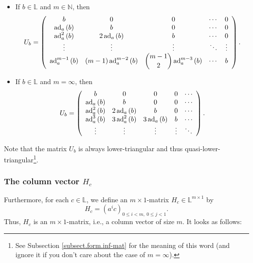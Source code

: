 \documentclass[numbers=enddot,12pt,final,onecolumn,notitlepage]{scrartcl}%
\theoremstyle{definition}
\begin{document}
\begin{itemize}
\item If $b\in\mathbb{L}$ and $m\in\mathbb{N}$, then%
\[
U_{b}=\left(
\begin{array}
[c]{ccccc}%
b & 0 & 0 & \cdots & 0\\
\operatorname*{ad}\nolimits_{a}\left(  b\right)  & b & 0 & \cdots & 0\\
\operatorname*{ad}\nolimits_{a}^{2}\left(  b\right)  & 2\operatorname*{ad}%
\nolimits_{a}\left(  b\right)  & b & \cdots & 0\\
\vdots & \vdots & \vdots & \ddots & \vdots\\
\operatorname*{ad}\nolimits_{a}^{m-1}\left(  b\right)  & \left(  m-1\right)
\operatorname*{ad}\nolimits_{a}^{m-2}\left(  b\right)  & \dbinom{m-1}%
{2}\operatorname*{ad}\nolimits_{a}^{m-3}\left(  b\right)  & \cdots & b
\end{array}
\right)  .
\]


\item If $b\in\mathbb{L}$ and $m=\infty$, then%
\[
U_{b}=\left(
\begin{array}
[c]{ccccc}%
b & 0 & 0 & 0 & \cdots\\
\operatorname*{ad}\nolimits_{a}\left(  b\right)  & b & 0 & 0 & \cdots\\
\operatorname*{ad}\nolimits_{a}^{2}\left(  b\right)  & 2\operatorname*{ad}%
\nolimits_{a}\left(  b\right)  & b & 0 & \cdots\\
\operatorname*{ad}\nolimits_{a}^{3}\left(  b\right)  & 3\operatorname*{ad}%
\nolimits_{a}^{2}\left(  b\right)  & 3\operatorname*{ad}\nolimits_{a}\left(
b\right)  & b & \cdots\\
\vdots & \vdots & \vdots & \vdots & \ddots
\end{array}
\right)  .
\]

\end{itemize}

Note that the matrix $U_{b}$ is always lower-triangular and thus
quasi-lower-triangular\footnote{See Subsection \ref{subsect.form.inf-mat} for
the meaning of this word (and ignore it if you don't care about the case of
$m=\infty$).}.

\subsubsection{The column vector $H_{c}$}

Furthermore, for each $c\in\mathbb{L}$, we define an $m\times1$-matrix
$H_{c}\in\mathbb{L}^{m\times1}$ by%
\begin{equation}
H_{c}=\left(  a^{i}c\right)  _{0\leq i<m,\ 0\leq j<1}. \label{eq.Hc=}%
\end{equation}
Thus, $H_{c}$ is an $m\times1$-matrix, i.e., a column vector of size $m$. It
looks as follows:
\end{document}

